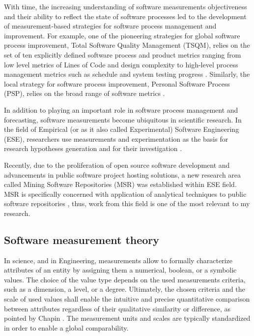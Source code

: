 With time, the increasing understanding of software measurements objectiveness and their ability to reflect 
the state of software processes led to the development of measurement-based strategies for software 
process management and improvement. 
For example, one of the pioneering strategies for global software process improvement, 
Total Software Quality Management (TSQM), relies on the set of ten explicitly defined software 
process and product metrics ranging from low level metrics of Lines of Code and design complexity to 
high-level process management metrics such as schedule and system testing progress \cite{citeulike:13071448}.
Similarly, the local strategy for software process improvement, Personal Software Process (PSP), relies on 
the broad range of software metrics \cite{citeulike:13072239}.

In addition to playing an important role in software process management and forecasting, software 
measurements become ubiquitous in scientific research. 
In the field of Empirical (or as it also called Experimental) Software Engineering (ESE), 
researchers use measurements and experimentation as the basis for research hypotheses 
generation and for their investigation \cite{citeulike:766768}. 

Recently, due to the proliferation of open source software development and advancements in public software
project hosting solutions, a new research area called Mining Software Repositories (MSR) was established 
within ESE field. MSR is specifically concerned with application of analytical techniques to public software 
repositories \cite{citeulike:12550438} \cite{citeulike:4534888} \cite{citeulike:2710928}, thus, work from 
this field is one of the most relevant to my research.

\subsection{Software measurement theory}
In science, and in Engineering, measurements allow to formally characterize attributes of an entity 
by assigning them a numerical, boolean, or a symbolic values. 
The choice of the value type depends on the used measurements criteria, such as a dimension, a level, 
or a degree. Ultimately, the chosen criteria and the scale of used values shall enable the intuitive 
and precise quantitative comparison between attributes regardless of their qualitative similarity or 
difference, as pointed by Chapin \cite{citeulike:13158806}. 
The measurement units and scales are typically standardized in order to enable a global comparability.

